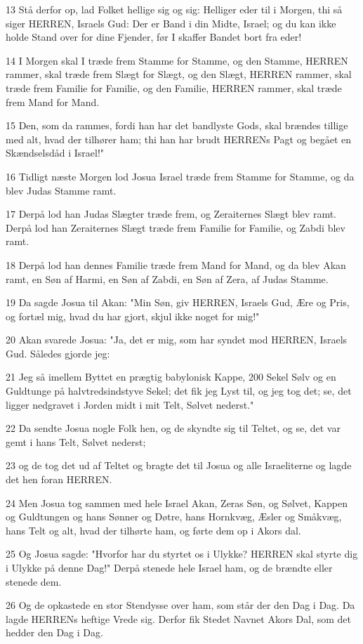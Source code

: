 \par 13 Stå derfor op, lad Folket hellige sig og sig: Helliger eder til i Morgen, thi så siger HERREN, Israels Gud: Der er Band i din Midte, Israel; og du kan ikke holde Stand over for dine Fjender, før I skaffer Bandet bort fra eder!
\par 14 I Morgen skal I træde frem Stamme for Stamme, og den Stamme, HERREN rammer, skal træde frem Slægt for Slægt, og den Slægt, HERREN rammer, skal træde frem Familie for Familie, og den Familie, HERREN rammer, skal træde frem Mand for Mand.
\par 15 Den, som da rammes, fordi han har det bandlyste Gods, skal brændes tillige med alt, hvad der tilhører ham; thi han har brudt HERRENs Pagt og begået en Skændselsdåd i Israel!"
\par 16 Tidligt næste Morgen lod Josua Israel træde frem Stamme for Stamme, og da blev Judas Stamme ramt.
\par 17 Derpå lod han Judas Slægter træde frem, og Zeraiternes Slægt blev ramt. Derpå lod han Zeraiternes Slægt træde frem Familie for Familie, og Zabdi blev ramt.
\par 18 Derpå lod han dennes Familie træde frem Mand for Mand, og da blev Akan ramt, en Søn af Harmi, en Søn af Zabdi, en Søn af Zera, af Judas Stamme.
\par 19 Da sagde Josua til Akan: "Min Søn, giv HERREN, Israels Gud, Ære og Pris, og fortæl mig, hvad du har gjort, skjul ikke noget for mig!"
\par 20 Akan svarede Josua: "Ja, det er mig, som har syndet mod HERREN, Israels Gud. Således gjorde jeg:
\par 21 Jeg så imellem Byttet en prægtig babylonisk Kappe, 200 Sekel Sølv og en Guldtunge på halvtredsindstyve Sekel; det fik jeg Lyst til, og jeg tog det; se, det ligger nedgravet i Jorden midt i mit Telt, Sølvet nederst."
\par 22 Da sendte Josua nogle Folk hen, og de skyndte sig til Teltet, og se, det var gemt i hans Telt, Sølvet nederst;
\par 23 og de tog det ud af Teltet og bragte det til Josua og alle Israeliterne og lagde det hen foran HERREN.
\par 24 Men Josua tog sammen med hele Israel Akan, Zeras Søn, og Sølvet, Kappen og Guldtungen og hans Sønner og Døtre, hans Hornkvæg, Æsler og Småkvæg, hans Telt og alt, hvad der tilhørte ham, og førte dem op i Akors dal.
\par 25 Og Josua sagde: "Hvorfor har du styrtet os i Ulykke? HERREN skal styrte dig i Ulykke på denne Dag!" Derpå stenede hele Israel ham, og de brændte eller stenede dem.
\par 26 Og de opkastede en stor Stendysse over ham, som står der den Dag i Dag. Da lagde HERRENs heftige Vrede sig. Derfor fik Stedet Navnet Akors Dal, som det hedder den Dag i Dag.

